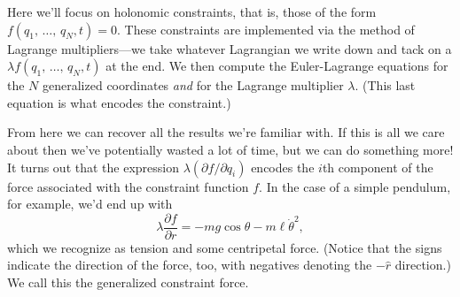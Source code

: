 \documentclass[../p111main.tex]{subfiles}
\begin{document}
Here we'll focus on holonomic constraints, that is, those of the form $f(q_1, \,\ldots, \,q_N, t) = 0$.
These constraints are implemented via the method of Lagrange multipliers---we take whatever Lagrangian we write down and tack on a $\lambda f(q_1, \,\ldots, \,q_N, t)$ at the end.
We then compute the Euler-Lagrange equations for the $N$ generalized coordinates \textit{and} for the Lagrange multiplier $\lambda$.
(This last equation is what encodes the constraint.)

From here we can recover all the results we're familiar with.
If this is all we care about then we've potentially wasted a lot of time, but we can do something more!
It turns out that the expression $\lambda (\partial f / \partial q_i)$ encodes the $i$th component of the force associated with the constraint function $f$.
In the case of a simple pendulum, for example, we'd end up with
\[ \lambda \frac{\partial f}{\partial r} = -mg \cos \theta - m \ell \dot \theta^2, \]
which we recognize as tension and some centripetal force.
(Notice that the signs indicate the direction of the force, too, with negatives denoting the $-\hat r$ direction.)
We call this the generalized constraint force.
\end{document}
